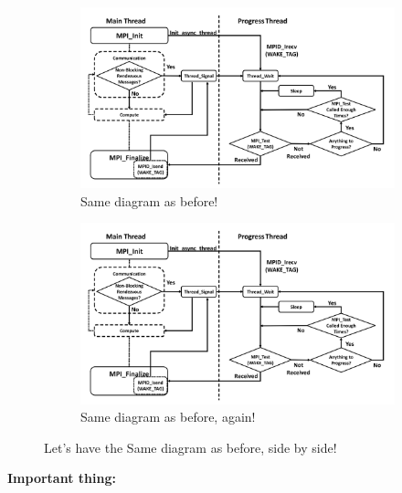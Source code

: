 \begin{figure}
	\centering
	\begin{subfigure}[b]{0.45\linewidth}
		\centering
		\includegraphics[width=\linewidth]{TexFiles/Figures/Dummy-Diagram.png}
		\caption{Same diagram as before!}
		\label{fig:left-sub-figure}
	\end{subfigure}
	\begin{subfigure}[b]{0.45\linewidth}
		\centering
		\includegraphics[width=\linewidth]{TexFiles/Figures/Dummy-Diagram.png}
		\caption{Same diagram as before, again!}
		\label{fig:right-sub-figure}
	\end{subfigure}
	\caption{Let's have the Same diagram as before, side by side!}
	\label{fig:Side-by-Side-Figure}
\end{figure}

\textbf{Important thing:} \lipsum[7-7]
